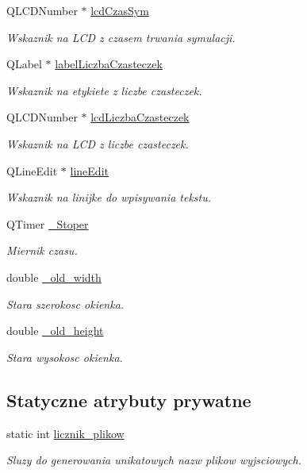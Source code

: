 \begin{DoxyCompactItemize}
Q\-L\-C\-D\-Number $\ast$ \hyperlink{class_okno_glowne_ab34fefe738e38b1b0d4ce764481cc0c6}{lcd\-Czas\-Sym}
\begin{DoxyCompactList}\small\item\em Wskaznik na L\-C\-D z czasem trwania symulacji. \end{DoxyCompactList}\item 
Q\-Label $\ast$ \hyperlink{class_okno_glowne_ab01460f1222d0ec2892abf21efb23078}{label\-Liczba\-Czasteczek}
\begin{DoxyCompactList}\small\item\em Wskaznik na etykiete z liczbe czasteczek. \end{DoxyCompactList}\item 
Q\-L\-C\-D\-Number $\ast$ \hyperlink{class_okno_glowne_adbdd9fc009725804e015d267dc8375dc}{lcd\-Liczba\-Czasteczek}
\begin{DoxyCompactList}\small\item\em Wskaznik na L\-C\-D z liczbe czasteczek. \end{DoxyCompactList}\item 
Q\-Line\-Edit $\ast$ \hyperlink{class_okno_glowne_a0112b8be70a26552b03f38fab43a3301}{line\-Edit}
\begin{DoxyCompactList}\small\item\em Wskaznik na linijke do wpisywania tekstu. \end{DoxyCompactList}\item 
Q\-Timer \hyperlink{class_okno_glowne_a5d047f90666212f58e69d11af3285d9b}{\-\_\-\-Stoper}
\begin{DoxyCompactList}\small\item\em Miernik czasu. \end{DoxyCompactList}\item 
double \hyperlink{class_okno_glowne_a6a0922607c0970ecdfe8adec7a773c7f}{\-\_\-old\-\_\-width}
\begin{DoxyCompactList}\small\item\em Stara szerokosc okienka. \end{DoxyCompactList}\item 
double \hyperlink{class_okno_glowne_a7dae1b25dbade179eb6dfc30ffeab14b}{\-\_\-old\-\_\-height}
\begin{DoxyCompactList}\small\item\em Stara wysokosc okienka. \end{DoxyCompactList}\end{DoxyCompactItemize}
\subsection*{Statyczne atrybuty prywatne}
\begin{DoxyCompactItemize}
\item 
static int \hyperlink{class_okno_glowne_ae615cbd9c9f9ab06b365c4692ff68729}{licznik\-\_\-plikow}
\begin{DoxyCompactList}\small\item\em Sluzy do generowania unikatowych nazw plikow wyjsciowych. \end{DoxyCompactList}\end{DoxyCompactItemize}


